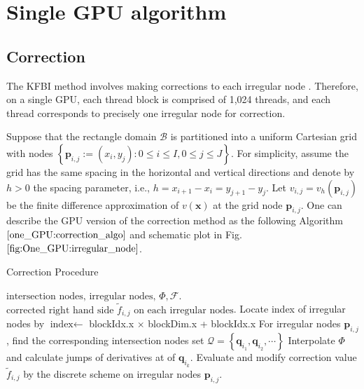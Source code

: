 \section{Single GPU algorithm} \label{oneGPU}

\subsection{Correction} \label{one_GPU:correct}
The KFBI method involves making corrections to each irregular node \cite{ying2007kernel}. Therefore, on a single GPU, each thread block is comprised of 1,024 threads, and each thread corresponds to precisely one irregular node for correction. 

Suppose that the rectangle domain $\mathcal{B}$ is partitioned into a uniform Cartesian grid with nodes $ \left\{\mathbf{p}_{i, j} :=\left(x_i, y_j\right): 0 \leq i \leq I, 0 \leq j \leq J\right\}$. For simplicity, assume the grid has the same spacing in the horizontal and vertical directions and denote by $h>0$ the spacing parameter, i.e., $h=x_{i+1}-x_i=y_{j+1}-y_j$. Let $v_{i,j} = v_{h}(\mathbf{p}_{i,j})$ be the finite difference approximation of $v(\mathbf{x})$ at the grid node $\mathbf{p}_{i, j}$.
One can describe the GPU version of the correction method as the following Algorithm $\ref{one_GPU:correction_algo}$ and schematic plot in Fig.\,$\ref{fig:One_GPU:irregular_node}$.
\begin{algorithm}
\renewcommand{\algorithmicrequire}{\textbf{Input:}}
\renewcommand{\algorithmicensure}{\textbf{Output:}}
\caption{Correction Procedure}
\begin{algorithmic}[1]
\Require $\text{intersection nodes, irregular nodes, } \Phi, \mathcal{F}$.
\Ensure $\text{corrected right hand side $\tilde{f}_{i,j}$ on each irregular nodes}$.
\State Locate index of irregular nodes by $\text{index} \xleftarrow[]{}$ blockIdx.x $\times$ blockDim.x + blockIdx.x
\State For irregular nodes $\mathbf{p}_{i,j}$, find the corresponding intersection nodes set $\mathcal{Q} = \left\{\mathbf{q}_{i_{1}}, \mathbf{q}_{i_{2}}, \cdots\right\}$
    \State Interpolate $\Phi$ and calculate jumps of derivatives at of $\mathbf{q}_{i_{k}}$.
    \State  Evaluate and modify correction value $\tilde{f}_{i,j}$ by the discrete scheme on irregular nodes $\mathbf{p}_{i,j}$.
    \EndFor
\end{algorithmic}\label{one_GPU:correction_algo}
\end{algorithm}

